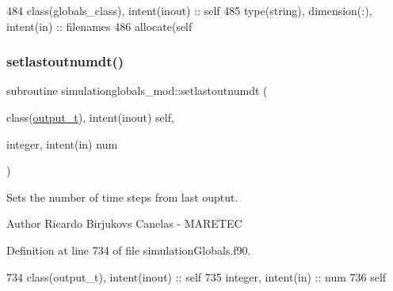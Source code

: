 \begin{DoxyCode}
484     \textcolor{keywordtype}{class}(globals\_class), \textcolor{keywordtype}{intent(inout)} :: self
485     \textcolor{keywordtype}{type}(string), \textcolor{keywordtype}{dimension(:)}, \textcolor{keywordtype}{intent(in)} :: filenames
486     \textcolor{keyword}{allocate}(self%
\end{DoxyCode}
\mbox{\label{namespacesimulationglobals__mod_ab760ab6064743ff54237166301346616}} 
\subsubsection{\texorpdfstring{setlastoutnumdt()}{setlastoutnumdt()}}
{\footnotesize\ttfamily subroutine simulationglobals\+\_\+mod\+::setlastoutnumdt (\begin{DoxyParamCaption}\item[{class(\mbox{\hyperlink{structsimulationglobals__mod_1_1output__t}{output\+\_\+t}}), intent(inout)}]{self,  }\item[{integer, intent(in)}]{num }\end{DoxyParamCaption})\hspace{0.3cm}{\ttfamily [private]}}



Sets the number of time steps from last ouptut. 

\begin{DoxyAuthor}{Author}
Ricardo Birjukovs Canelas -\/ M\+A\+R\+E\+T\+EC 
\end{DoxyAuthor}


Definition at line 734 of file simulation\+Globals.\+f90.


\begin{DoxyCode}
734     \textcolor{keywordtype}{class}(output\_t), \textcolor{keywordtype}{intent(inout)} :: self
735     \textcolor{keywordtype}{integer}, \textcolor{keywordtype}{intent(in)} :: num
736     self%
\end{DoxyCode}
\mbox{\label{namespacesimulationglobals__mod_affd52c4c7b1c3f7ce282eeb7e4b4a359}} 
